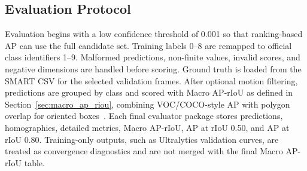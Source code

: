 \subsection{Evaluation Protocol}
\label{sec:experimental_setup}

Evaluation begins with a low confidence threshold of 0.001 so that ranking-based AP can use the full candidate set. Training labels 0--8 are remapped to official class identifiers 1--9. Malformed predictions, non-finite values, invalid scores, and negative dimensions are handled before scoring. Ground truth is loaded from the SMART CSV for the selected validation frames. After optional motion filtering, predictions are grouped by class and scored with Macro AP-rIoU as defined in Section~\ref{sec:macro_ap_riou}, combining VOC/COCO-style AP with polygon overlap for oriented boxes~\cite{Everingham2015PASCAL,Lin2014COCO,Ding2022DOTA}. Each final evaluator package stores predictions, homographies, detailed metrics, Macro AP-rIoU, AP at rIoU 0.50, and AP at rIoU 0.80. Training-only outputs, such as Ultralytics validation curves, are treated as convergence diagnostics and are not merged with the final Macro AP-rIoU table.

